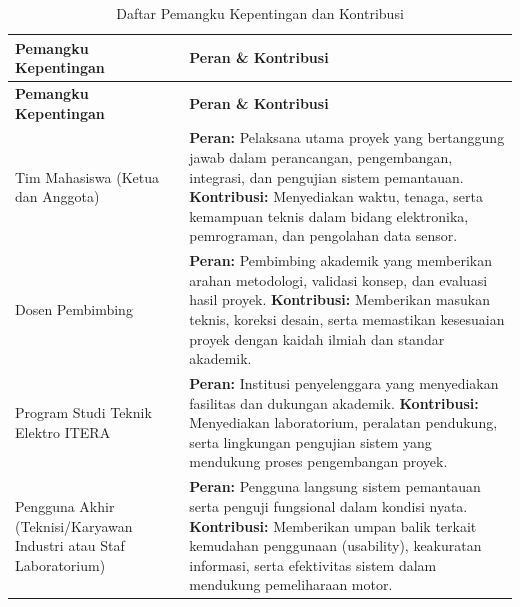 \documentclass{elsinta}
\begin{document}
\begin{longtable}{|p{5cm}|p{9cm}|}
\caption{Daftar Pemangku Kepentingan dan Kontribusi} \\
\hline
\textbf{Pemangku Kepentingan} & \textbf{Peran \& Kontribusi} \\
\hline
\endfirsthead

\hline
\textbf{Pemangku Kepentingan} & \textbf{Peran \& Kontribusi} \\
\hline
\endhead

Tim Mahasiswa (Ketua dan Anggota) &
\textbf{Peran:} Pelaksana utama proyek yang bertanggung jawab dalam perancangan, pengembangan, integrasi, dan pengujian sistem pemantauan. \newline
\textbf{Kontribusi:} Menyediakan waktu, tenaga, serta kemampuan teknis dalam bidang elektronika, pemrograman, dan pengolahan data sensor. \\
\hline

Dosen Pembimbing &
\textbf{Peran:} Pembimbing akademik yang memberikan arahan metodologi, validasi konsep, dan evaluasi hasil proyek. \newline
\textbf{Kontribusi:} Memberikan masukan teknis, koreksi desain, serta memastikan kesesuaian proyek dengan kaidah ilmiah dan standar akademik. \\
\hline

Program Studi Teknik Elektro ITERA &
\textbf{Peran:} Institusi penyelenggara yang menyediakan fasilitas dan dukungan akademik. \newline
\textbf{Kontribusi:} Menyediakan laboratorium, peralatan pendukung, serta lingkungan pengujian sistem yang mendukung proses pengembangan proyek. \\
\hline

Pengguna Akhir (Teknisi/Karyawan Industri atau Staf Laboratorium) &
\textbf{Peran:} Pengguna langsung sistem pemantauan serta penguji fungsional dalam kondisi nyata. \newline
\textbf{Kontribusi:} Memberikan umpan balik terkait kemudahan penggunaan (usability), keakuratan informasi, serta efektivitas sistem dalam mendukung pemeliharaan motor. \\
\hline



\end{longtable}
\end{document}
